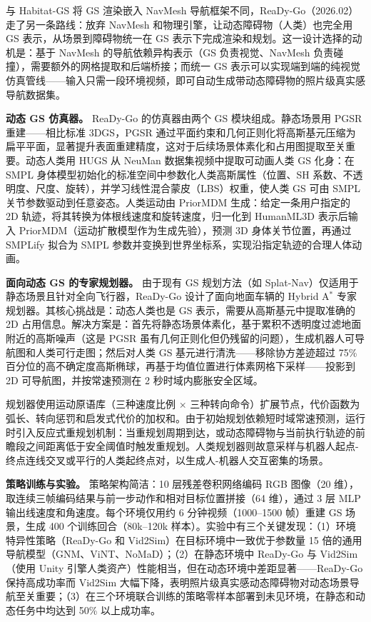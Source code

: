 与 Habitat-GS 将 GS 渲染嵌入 NavMesh 导航框架不同，ReaDy-Go（2026.02）~\cite{2602_11575} 走了另一条路线：放弃 NavMesh 和物理引擎，让动态障碍物（人类）也完全用 GS 表示，从场景到障碍物统一在 GS 表示下完成渲染和规划。这一设计选择的动机是：基于 NavMesh 的导航依赖异构表示（GS 负责视觉、NavMesh 负责碰撞），需要额外的网格提取和后端桥接；而统一 GS 表示可以实现端到端的纯视觉仿真管线——输入只需一段环境视频，即可自动生成带动态障碍物的照片级真实感导航数据集。

\textbf{动态 GS 仿真器。}
ReaDy-Go 的仿真器由两个 GS 模块组成。静态场景用 PGSR 重建——相比标准 3DGS，PGSR 通过平面约束和几何正则化将高斯基元压缩为扁平平面，显著提升表面重建精度，这对于后续场景体素化和占用图提取至关重要。动态人类用 HUGS 从 NeuMan 数据集视频中提取可动画人类 GS 化身：在 SMPL 身体模型初始化的标准空间中参数化人类高斯属性（位置、SH 系数、不透明度、尺度、旋转），并学习线性混合蒙皮（LBS）权重，使人类 GS 可由 SMPL 关节参数驱动到任意姿态。人类运动由 PriorMDM 生成：给定一条用户指定的 2D 轨迹，将其转换为体根线速度和旋转速度，归一化到 HumanML3D 表示后输入 PriorMDM（运动扩散模型作为生成先验），预测 3D 身体关节位置，再通过 SMPLify 拟合为 SMPL 参数并变换到世界坐标系，实现沿指定轨迹的合理人体动画。

\textbf{面向动态 GS 的专家规划器。}
由于现有 GS 规划方法（如 Splat-Nav）仅适用于静态场景且针对全向飞行器，ReaDy-Go 设计了面向地面车辆的 Hybrid A$^*$ 专家规划器。其核心挑战是：动态人类也是 GS 表示，需要从高斯基元中提取准确的 2D 占用信息。解决方案是：首先将静态场景体素化，基于累积不透明度过滤地面附近的高斯噪声（这是 PGSR 虽有几何正则化但仍残留的问题），生成机器人可导航图和人类可行走图；然后对人类 GS 基元进行清洗——移除协方差迹超过 75\% 百分位的高不确定度高斯椭球，再基于均值位置进行体素网格下采样——投影到 2D 可导航图，并按常速预测在 2 秒时域内膨胀安全区域。

规划器使用运动原语库（三种速度比例 $\times$ 三种转向命令）扩展节点，代价函数为弧长、转向惩罚和启发式代价的加权和。由于初始规划依赖短时域常速预测，运行时引入反应式重规划机制：当重规划周期到达，或动态障碍物与当前执行轨迹的前瞻段之间距离低于安全阈值时触发重规划。人类规划器则故意采样与机器人起点-终点连线交叉或平行的人类起终点对，以生成人-机器人交互密集的场景。

\textbf{策略训练与实验。}
策略架构简洁：10 层残差卷积网络编码 RGB 图像（20 维），取连续三帧编码结果与前一步动作和相对目标位置拼接（64 维），通过 3 层 MLP 输出线速度和角速度。每个环境仅用约 6 分钟视频（1000--1500 帧）重建 GS 场景，生成 400 个训练回合（80k--120k 样本）。实验中有三个关键发现：（1）环境特异性策略（ReaDy-Go 和 Vid2Sim）在目标环境中一致优于参数量 15 倍的通用导航模型（GNM、ViNT、NoMaD）；（2）在静态环境中 ReaDy-Go 与 Vid2Sim（使用 Unity 引擎人类资产）性能相当，但在动态环境中差距显著——ReaDy-Go 保持高成功率而 Vid2Sim 大幅下降，表明照片级真实感动态障碍物对动态场景导航至关重要；（3）在三个环境联合训练的策略零样本部署到未见环境，在静态和动态任务中均达到 50\% 以上成功率。

